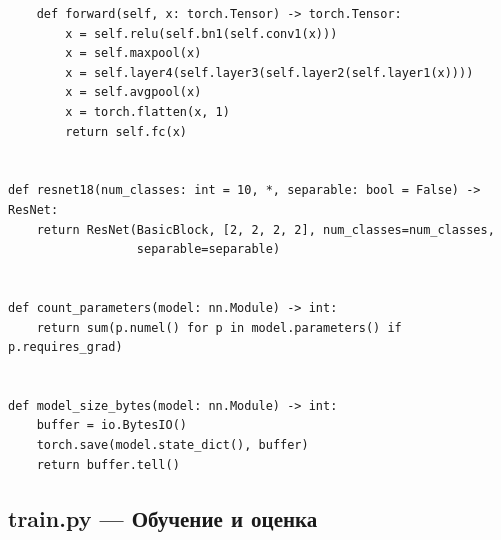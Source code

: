 \begin{verbatim}
    def forward(self, x: torch.Tensor) -> torch.Tensor:
        x = self.relu(self.bn1(self.conv1(x)))
        x = self.maxpool(x)
        x = self.layer4(self.layer3(self.layer2(self.layer1(x))))
        x = self.avgpool(x)
        x = torch.flatten(x, 1)
        return self.fc(x)


def resnet18(num_classes: int = 10, *, separable: bool = False) -> ResNet:
    return ResNet(BasicBlock, [2, 2, 2, 2], num_classes=num_classes,
                  separable=separable)


def count_parameters(model: nn.Module) -> int:
    return sum(p.numel() for p in model.parameters() if p.requires_grad)


def model_size_bytes(model: nn.Module) -> int:
    buffer = io.BytesIO()
    torch.save(model.state_dict(), buffer)
    return buffer.tell()
\end{verbatim}

\subsection*{train.py — Обучение и оценка}

